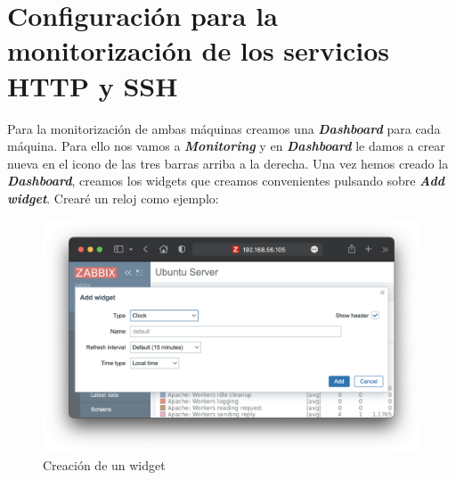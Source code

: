 \section{Configuración para la monitorización de los servicios HTTP y SSH}
Para la monitorización de ambas máquinas creamos una \textbf{\emph{Dashboard}} para cada máquina. Para ello nos vamos a \textbf{\emph{Monitoring}} y en \textbf{\emph{Dashboard}} le damos a crear nueva en el icono de las tres barras arriba a la derecha. Una vez hemos creado la \textbf{\emph{Dashboard}}, creamos los widgets que creamos convenientes pulsando sobre \textbf{\emph{Add widget}}. Crearé un reloj como ejemplo:
    \begin{figure}[H]
        \centering
        \includegraphics[scale=0.3]{images/widget.png}
        \caption{Creación de un widget}
        \label{fig:widget}
    \end{figure}


